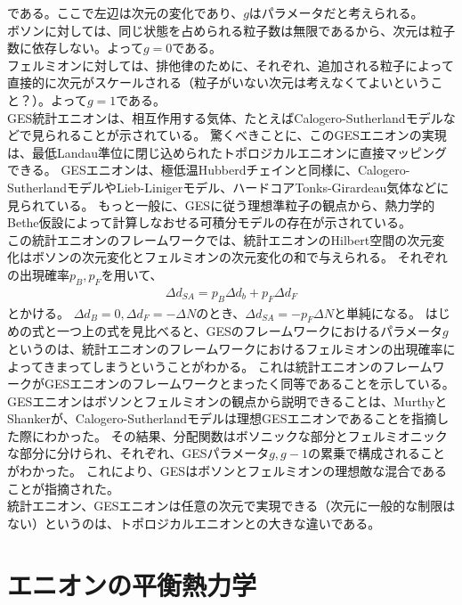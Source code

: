 \documentclass[a4paper,11pt]{jsarticle}
\numberwithin{equation}{section}
\begin{document}
である。ここで左辺は次元の変化であり、$g$はパラメータだと考えられる。\\
ボソンに対しては、同じ状態を占められる粒子数は無限であるから、次元は粒子数に依存しない。よって$g=0$である。\\
フェルミオンに対しては、排他律のために、それぞれ、追加される粒子によって直接的に次元がスケールされる（粒子がいない次元は考えなくてよいということ？）。よって$g=1$である。\\
GES統計エニオンは、相互作用する気体、たとえばCalogero-Sutherlandモデルなどで見られることが示されている。
驚くべきことに、このGESエニオンの実現は、最低Landau準位に閉じ込められたトポロジカルエニオンに直接マッピングできる。
GESエニオンは、極低温Hubberdチェインと同様に、Calogero-SutherlandモデルやLieb-Linigerモデル、ハードコアTonks-Girardeau気体などに見られている。
もっと一般に、GESに従う理想準粒子の観点から、熱力学的Bethe仮設によって計算しなおせる可積分モデルの存在が示されている。\\
この統計エニオンのフレームワークでは、統計エニオンのHilbert空間の次元変化はボソンの次元変化とフェルミオンの次元変化の和で与えられる。
それぞれの出現確率$p_B,p_F$を用いて、
\begin{align}
\Delta d_{SA}=p_B\Delta d_b+p_F\Delta d_F
\end{align}
とかける。
$\Delta d_B=0,\Delta d_F=-\Delta N$のとき、$\Delta d_{SA}=-p_F\Delta N$と単純になる。
はじめの式と一つ上の式を見比べると、GESのフレームワークにおけるパラメータ$g$というのは、統計エニオンのフレームワークにおけるフェルミオンの出現確率によってきまってしまうということがわかる。
これは統計エニオンのフレームワークがGESエニオンのフレームワークとまったく同等であることを示している。
GESエニオンはボソンとフェルミオンの観点から説明できることは、MurthyとShankerが、Calogero-Sutherlandモデルは理想GESエニオンであることを指摘した際にわかった。
その結果、分配関数はボソニックな部分とフェルミオニックな部分に分けられ、それぞれ、GESパラメータ$g,g-1$の累乗で構成されることがわかった。
これにより、GESはボソンとフェルミオンの理想敵な混合であることが指摘された。\\
統計エニオン、GESエニオンは任意の次元で実現できる（次元に一般的な制限はない）というのは、トポロジカルエニオンとの大きな違いである。


\section{エニオンの平衡熱力学}
\end{document}

